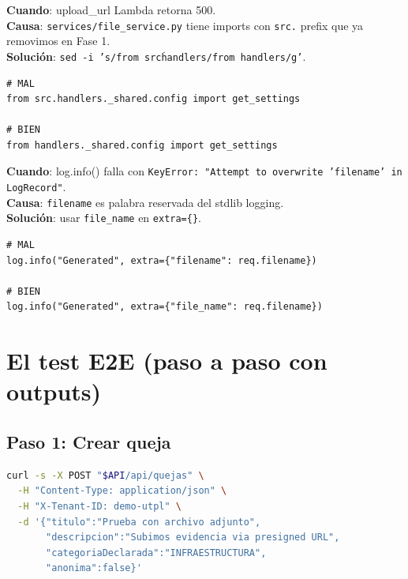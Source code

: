 \documentclass[11pt,a4paper,oneside]{article}
\begin{document}
\begin{tcolorbox}[colback=errred!5!white,colframe=errred,breakable,title={Bug 1: \texttt{from src.handlers.\_shared} en file\_service.py}]
\textbf{Cuando}: upload\_url Lambda retorna 500. \\
\textbf{Causa}: \texttt{services/file\_service.py} tiene imports con \texttt{src.} prefix que ya removimos en Fase 1. \\
\textbf{Soluci\'on}: \texttt{sed -i 's/from src\.handlers/from handlers/g'}.

\begin{lstlisting}
# MAL
from src.handlers._shared.config import get_settings

# BIEN
from handlers._shared.config import get_settings
\end{lstlisting}
\end{tcolorbox}

\begin{tcolorbox}[colback=errred!5!white,colframe=errred,breakable,title={Bug 2: KeyError 'filename' en logger}]
\textbf{Cuando}: log.info() falla con \texttt{KeyError: "Attempt to overwrite 'filename' in LogRecord"}. \\
\textbf{Causa}: \texttt{filename} es palabra reservada del stdlib logging. \\
\textbf{Soluci\'on}: usar \texttt{file\_name} en \texttt{extra=\{\}}.

\begin{lstlisting}
# MAL
log.info("Generated", extra={"filename": req.filename})

# BIEN
log.info("Generated", extra={"file_name": req.filename})
\end{lstlisting}
\end{tcolorbox}

\section{El test E2E (paso a paso con outputs)}

\subsection{Paso 1: Crear queja}

\begin{lstlisting}[language=bash]
curl -s -X POST "$API/api/quejas" \
  -H "Content-Type: application/json" \
  -H "X-Tenant-ID: demo-utpl" \
  -d '{"titulo":"Prueba con archivo adjunto",
       "descripcion":"Subimos evidencia via presigned URL",
       "categoriaDeclarada":"INFRAESTRUCTURA",
       "anonima":false}'
\end{lstlisting}
\end{document}
